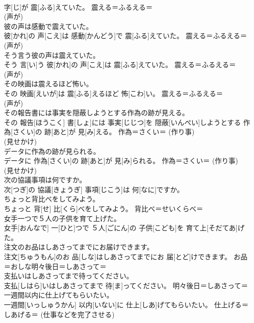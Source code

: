 \documentclass[8pt]{extreport}
\begin{document}
\begin{CJK}{UTF8}{min}
{\\	字[じ]が 震[ふる]えていた。	震える＝ふるえる＝ 
\\	(声が) 
\\	彼の声は感動で震えていた。	
\\	彼[かれ]の 声[こえ]は 感動[かんどう]で 震[ふる]えていた。	震える＝ふるえる＝ 
\\	(声が) 
\\	そう言う彼の声は震えていた。	
\\	そう 言[い]う 彼[かれ]の 声[こえ]は 震[ふる]えていた。	震える＝ふるえる＝ 
\\	(声が) 
\\	その映画は震えるほど怖い。	
\\	その 映画[えいが]は 震[ふる]えるほど 怖[こわ]い。	震える＝ふるえる＝ 
\\	(声が) 
\\	その報告書には事実を隠蔽しようとする作為の跡が見える。	
\\	その 報告[ほうこく] 書[しょ]には 事実[じじつ]を 隠蔽[いんぺい]しようとする 作為[さくい]の 跡[あと]が 見[み]える。	作為＝さくい＝ (作り事) 
\\	(見せかけ) 
\\	データに作為の跡が見られる。	
\\	データに 作為[さくい]の 跡[あと]が 見[み]られる。	作為＝さくい＝ (作り事) 
\\	(見せかけ) 
\\	次の協議事項は何ですか。	
\\	次[つぎ]の 協議[きょうぎ] 事項[じこう]は 何[なに]ですか。	
\\	ちょっと背比べをしてみよう。	
\\	ちょっと 背[せ] 比[くら]べをしてみよう。	背比べ＝せいくらべ＝ 
\\	女手一つで５人の子供を育て上げた。	
\\	女手[おんなで] 一[ひと]つで ５人[ごにん]の 子供[こども]を 育て上[そだてあ]げた。	
\\	注文のお品はしあさってまでにお届けできます。	
\\	注文[ちゅうもん]のお 品[しな]はしあさってまでにお 届[とど]けできます。	お品＝おしな明々後日＝しあさって＝ 
\\	支払いはしあさってまで待ってください。	
\\	支払[しはら]いはしあさってまで 待[ま]ってください。	明々後日＝しあさって＝ 
\\	一週間以内に仕上げてもらいたい。	
\\	一週間[いっしゅうかん] 以内[いない]に 仕上[しあ]げてもらいたい。	仕上げる＝しあげる＝ (仕事などを完了させる) 
}
\end{CJK}
\end{document}
